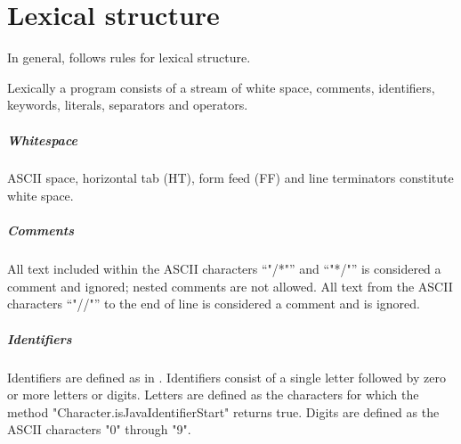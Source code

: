 \chapter{Lexical structure}

In general, \Xten{} follows \java{} rules \cite[Chapter 3]{jls2} for
lexical structure.

Lexically a program consists of a stream of white space, comments,
identifiers, keywords, literals, separators and operators.

\paragraph{Whitespace}
ASCII space, horizontal tab (HT), form feed (FF) and line
terminators constitute white space.

\paragraph{Comments}
All text included within the ASCII characters ``\xcd"/*"'' and
``\xcd"*/"'' is
considered a comment and ignored; nested comments are not
allowed.  All text from the ASCII characters
``\xcd"//"'' to the end of line is considered a comment and is ignored.

\paragraph{Identifiers}

Identifiers  are defined as in \java.
Identifiers consist of a single letter followed by zero or more
letters or digits.
Letters are defined as the characters for which the \java{}
method \xcd"Character.isJavaIdentifierStart" returns true.
Digits are defined as the ASCII characters \xcd"0" through \xcd"9".


